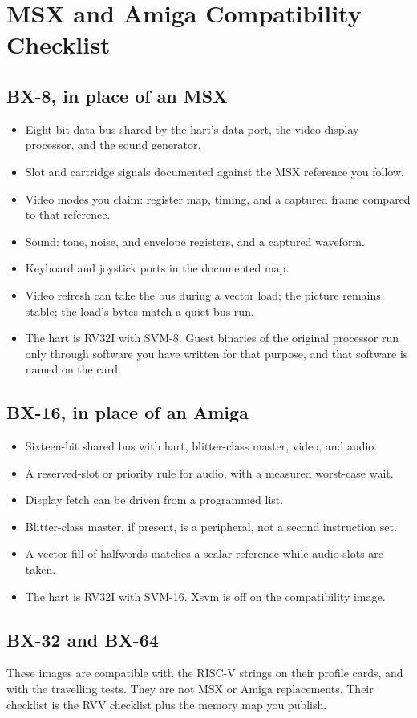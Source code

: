 \chapter{MSX and Amiga Compatibility Checklist}

\section{BX-8, in place of an MSX}

\begin{itemize}[leftmargin=1.5em]
  \item Eight-bit data bus shared by the hart's data port, the video display processor, and the sound generator.
  \item Slot and cartridge signals documented against the MSX reference you follow.
  \item Video modes you claim: register map, timing, and a captured frame compared to that reference.
  \item Sound: tone, noise, and envelope registers, and a captured waveform.
  \item Keyboard and joystick ports in the documented map.
  \item Video refresh can take the bus during a vector load; the picture remains stable; the load's bytes match a quiet-bus run.
  \item The hart is RV32I with SVM-8. Guest binaries of the original processor run only through software you have written for that purpose, and that software is named on the card.
\end{itemize}

\section{BX-16, in place of an Amiga}

\begin{itemize}[leftmargin=1.5em]
  \item Sixteen-bit shared bus with hart, blitter-class master, video, and audio.
  \item A reserved-slot or priority rule for audio, with a measured worst-case wait.
  \item Display fetch can be driven from a programmed list.
  \item Blitter-class master, if present, is a peripheral, not a second instruction set.
  \item A vector fill of halfwords matches a scalar reference while audio slots are taken.
  \item The hart is RV32I with SVM-16. Xsvm is off on the compatibility image.
\end{itemize}

\section{BX-32 and BX-64}

These images are compatible with the RISC-V strings on their profile cards, and with the travelling tests. They are not MSX or Amiga replacements. Their checklist is the RVV checklist plus the memory map you publish.
